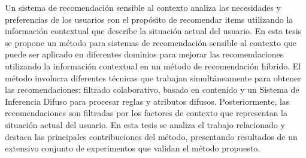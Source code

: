 
% 




Un sistema de recomendaci\'on sensible al contexto analiza  las
necesidades y preferencias de los  usuarios con el prop\'osito de
recomendar items utilizando la informaci\'on contextual que describe
la situaci\'on actual del usuario. En esta tesis se propone un
m\'etodo para sistemas de recomendaci\'on sensible al contexto que
puede ser aplicado en diferentes dominios para mejorar las
recomendaciones  utilizando la informaci\'on contextual en un m\'etodo
de recomendaci\'on h\'ibrido. El m\'etodo involucra diferentes
t\'ecnicas que trabajan simult\'aneamente para obtener las
recomendaciones: filtrado colaborativo, basado en contenido  y un
Sistema de Inferencia Difuso para procesar reglas y atributos difusos.
Posteriormente, las recomendaciones son filtradas por los factores de
contexto que representan la situaci\'on actual del usuario.
En esta tesis se analiza el trabajo relacionado y destaca las
principales contribuciones del m\'etodo, presentando resultados de un
extensivo conjunto de experimentos que validan el m\'etodo propuesto.


